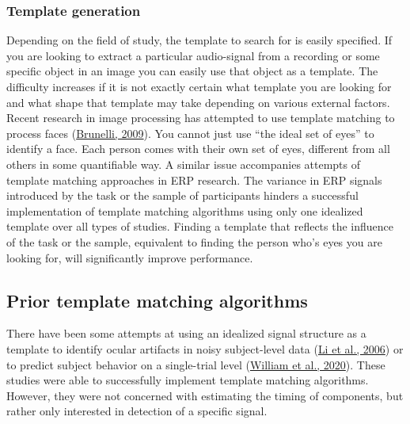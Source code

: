 \documentclass[
  man]{apa7}
\begin{document}
\hypertarget{template-generation}{%
\subsubsection{Template generation}\label{template-generation}}

Depending on the field of study, the template to search for is easily specified. If you are looking to extract a particular audio-signal from a recording or some specific object in an image you can easily use that object as a template. The difficulty increases if it is not exactly certain what template you are looking for and what shape that template may take depending on various external factors. Recent research in image processing has attempted to use template matching to process faces (\protect\hyperlink{ref-brunelli2009template}{Brunelli, 2009}). You cannot just use ``the ideal set of eyes'' to identify a face. Each person comes with their own set of eyes, different from all others in some quantifiable way. A similar issue accompanies attempts of template matching approaches in ERP research. The variance in ERP signals introduced by the task or the sample of participants hinders a successful implementation of template matching algorithms using only one idealized template over all types of studies. Finding a template that reflects the influence of the task or the sample, equivalent to finding the person who's eyes you are looking for, will significantly improve performance.

\hypertarget{prior-template-matching-algorithms}{%
\subsection{Prior template matching algorithms}\label{prior-template-matching-algorithms}}

There have been some attempts at using an idealized signal structure as a template to identify ocular artifacts in noisy subject-level data (\protect\hyperlink{ref-li2006automatic}{Li et al., 2006}) or to predict subject behavior on a single-trial level (\protect\hyperlink{ref-william2020erp}{William et al., 2020}). These studies were able to successfully implement template matching algorithms. However, they were not concerned with estimating the timing of components, but rather only interested in detection of a specific signal.
\end{document}
